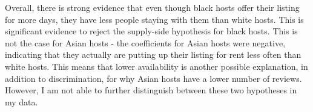 Overall, there is strong evidence that even though black hosts offer their listing for more days, they have less people staying with them than white hosts. This is significant evidence to reject the supply-side hypothesis for black hosts. This is not the case for Asian hosts - the coefficients for Asian hosts were negative, indicating that they actually are putting up their listing for rent less often than white hosts. This means that lower availability is another possible explanation, in addition to discrimination, for why Asian hosts have a lower number of reviews. However, I am not able to further distinguish between these two hypotheses in my data.  


\begin{comment}
	coThis might be because Airbnb listings tend to be more concentrated in certain areas of each city (North Side in Chicago, lower and middle Manhattan in New York City, etc). If listings in a city cluster together instead of being uniformly dispersed, then controlling for location won't explain as much of the variation as controlling for property characteristics. LISTING OR PROPERTY PICK ONE - FIX
	
	It is well-documented that blacks in urban populations are nearly four times more likely than whites to live in neighborhoods where the poverty rate is 40\% or higher \cite{firebaugh}. 
	
	The coefficients for minority hosts decrease from a range of \$20-40 to a range of \$10-20 (these are all negative, and relative to white male hosts). I observe the largest decrease in the coefficients on black hosts, which go down from \$40 to roughly \$15. Coefficients of Hispanic hosts decrease by around \$10; Asian hosts by about \$20. In fact, minorities at every income level live in poorer neighborhoods than do whites with comparable incomes. For example, a black household earning \$75,000 a year resides in a higher-poverty neighborhood than a white household with earnings of less than \$40,000 a year \cite{logan}. The coefficients of white females, on the other hand, persist at around \$4 with the addition of location controls. This is most likely because white females tend to live in the same areas as white males and therefore have little to no variation in price that can be explained by differences in neighborhood.  
	
	Asian female hosts have the largest decrease in coefficient after controlling for listing characteristics, which indicates that a substantial part of their effect is driven by owning properties with worse observable characteristics. The effects on middle-aged and senior hosts are almost eliminated by controlling for property characteristics, indicating that their higher listing prices are primarily driven by better observable characteristics. 
	

\end{comment}
